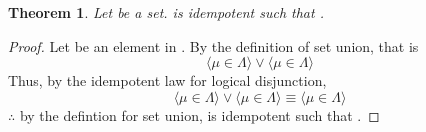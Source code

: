 \documentclass[preview]{standalone}
\newtheorem{theorem}{Theorem}
\begin{document}
\begin{theorem} %
    Let \bm{$\Lambda$} be a set. 
    \bm{$\Lambda$} is idempotent such that 
    \bm{$\Lambda \cup \Lambda = \Lambda$}.
\end{theorem}
\begin{proof}
    Let \bm{$\mu$} be an element in \bm{$\Lambda \cup \Lambda$}. 
    By the definition of set union, that is 
    \begin{equation*}
        \Big \langle \mu \in \Lambda \Big \rangle 
            \lor 
        \Big \langle \mu \in \Lambda \Big \rangle
    \end{equation*}
    Thus, by the idempotent law for logical disjunction, 
    \begin{equation*}
        \Big \langle \mu \in \Lambda \Big \rangle 
            \lor 
        \Big \langle \mu \in \Lambda \Big \rangle 
            \equiv 
        \Big \langle \mu \in \Lambda \Big \rangle
    \end{equation*}
    $\therefore$ by the defintion for set union,
    \bm{$\Lambda$} is idempotent such that 
    \bm{$\Lambda \cup \Lambda = \Lambda$}.
\end{proof}
\end{document}
